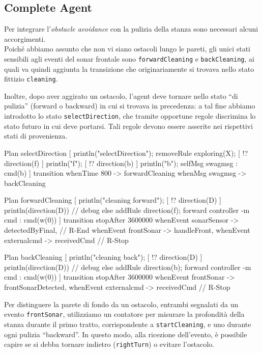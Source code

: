 \documentclass{../llncs}
\newcommand{\codescript}[1]{{\mbox{\small{\texttt{#1}}}}\xspace}
\begin{document}
\subsection{Complete Agent}
Per integrare l'\emph{obstacle avoidance} con la pulizia della stanza sono necessari alcuni accorgimenti.\\

Poiché abbiamo assunto che non vi siano ostacoli lungo le pareti, gli unici stati sensibili agli eventi del sonar frontale sono \codescript{forwardCleaning} e \codescript{backCleaning}, ai quali va quindi aggiunta la transizione che originariamente si trovava nello stato fittizio \codescript{cleaning}.

Inoltre, dopo aver aggirato un ostacolo, l'agent deve tornare nello stato ``di pulizia'' (forward o backward) in cui si trovava in precedenza: a tal fine abbiamo introdotto lo stato \codescript{selectDirection}, che tramite opportune regole discrimina lo stato futuro in cui deve portarsi. Tali regole devono essere asserite nei rispettivi stati di provenienza.\\

\begin{qacode}[caption={SoftwareAgent, pt11}]
Plan selectDirection [
	println("selectDirection");
	removeRule exploring(X);
	[ !? direction(f) ] println("f");
	[ !? direction(b) ] { println("b"); selfMsg swagmsg : cmd(b) }
]
transition
	whenTime 800 -> forwardCleaning
	whenMsg swagmsg -> backCleaning
	
Plan forwardCleaning [
	println("cleaning forward");
	[ !? direction(D) ]
		println(direction(D)) // debug
	else
		addRule direction(f);
	forward controller -m cmd : cmd(w(0))
]
transition stopAfter 3600000
	whenEvent sonarSensor -> detectedByFinal, // R-End
	whenEvent frontSonar -> handleFront,
	whenEvent externalcmd -> receivedCmd // R-Stop

Plan backCleaning [
	println("cleaning back");
	[ !? direction(D) ]
		println(direction(D)) // debug
	else
		addRule direction(b);
	forward controller -m cmd : cmd(w(0))
]
transition stopAfter 3600000
	whenEvent frontSonar -> frontSonarDetected,
	whenEvent externalcmd -> receivedCmd // R-Stop
\end{qacode}

Per distinguere la parete di fondo da un ostacolo, entrambi segnalati da un evento \codescript{frontSonar}, utilizziamo un contatore per misurare la profondità della stanza durante il primo tratto, corrispondente a \codescript{startCleaning}, e uno durante ogni pulizia ``backward''. In questo modo, alla ricezione dell'evento, è possibile capire se si debba tornare indietro (\codescript{rightTurn}) o evitare l'ostacolo.\\
\end{document}
